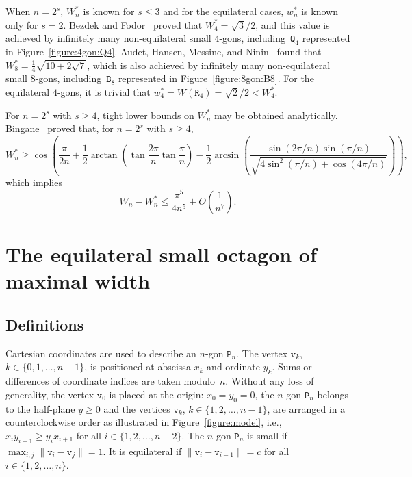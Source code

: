 \documentclass[a4paper,12pt]{article}
\theoremstyle{definition}
\theoremstyle{plain}
\newcommand{\ub}[1]{\overline{#1}}
\newcommand{\geo}[1]{\mathtt{#1}}
\begin{document}
When $n = 2^s$, $W_n^*$ is known for $s \le 3$ and for the equilateral cases, $w_n^*$ is known only for $s = 2$. Bezdek and Fodor~\cite{bezdek2000} proved that $W_4^* = \sqrt{3}/2$, and this value is achieved by infinitely many non-equilateral small $4$-gons, including~$\geo{Q}_4$ represented in Figure~\ref{figure:4gon:Q4}. Audet, Hansen, Messine, and Ninin~\cite{audet2013} found that $W_8^* = \frac{1}{4}\sqrt{10+2\sqrt{7}}$, which is also achieved by infinitely many non-equilateral small $8$-gons, including~$\geo{B}_8$ represented in Figure~\ref{figure:8gon:B8}. For the equilateral $4$-gons, it is trivial that $w_4^* = W(\geo{R}_4) = \sqrt{2}/2 < W_4^*$.

For $n = 2^s$ with $s\ge 4$, tight lower bounds on $W_n^*$ may be obtained analytically. Bingane~\cite{bingane2021b,bingane2021d} proved that, for $n=2^s$ with $s\ge 4$,
\[
W_n^* \ge \cos \left(\frac{\pi}{2n} + \frac{1}{2}\arctan \left(\tan \frac{2\pi}{n}\tan \frac{\pi}{n}\right)-\frac{1}{2}\arcsin\left(\frac{\sin (2\pi/n) \sin (\pi/n)}{\sqrt{4\sin^2(\pi/n) + \cos (4\pi/n)}}\right)\right),
\]
which implies
\[
\ub{W}_n - W_n^* \le \frac{\pi^5}{4n^5} + O\left(\frac{1}{n^7}\right).
\]

\section{The equilateral small octagon of maximal width}\label{sec:F8}

\subsection{Definitions}
Cartesian coordinates are used to describe an $n$-gon $\geo{P}_n$. The vertex $\geo{v}_k$, $k\in \{0,1,\ldots,n-1\}$, is positioned at abscissa $x_k$ and ordinate $y_k$. Sums or differences of coordinate indices are taken modulo~$n$. Without any loss of generality, the vertex $\geo{v}_0$ is placed at the origin: $x_0 = y_0 = 0$, the $n$-gon $\geo{P}_n$ belongs to the half-plane $y\ge 0$ and the vertices $\geo{v}_k$, $k \in \{1,2,\ldots,n-1\}$, are arranged in a counterclockwise order as illustrated in Figure~\ref{figure:model}, i.e., $x_iy_{i+1} \ge y_ix_{i+1}$ for all $i \in \{1,2,\ldots,n-2\}$. The $n$-gon $\geo{P}_n$ is small if $\max_{i,j} \|\geo{v}_i - \geo{v}_j\| = 1$. It is equilateral if $\|\geo{v}_i - \geo{v}_{i-1}\| = c$ for all $i\in \{1,2,\ldots,n\}$.
\end{document}
